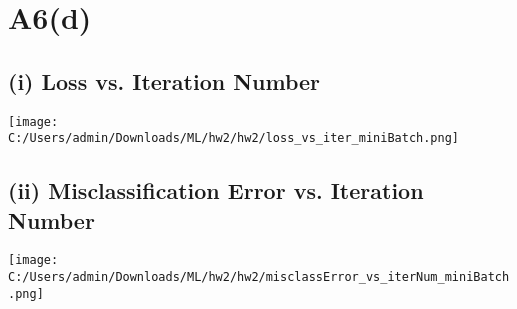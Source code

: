 \documentclass{article}
\begin{document}
\section*{A6(d)}

\subsection*{(i) Loss vs. Iteration Number}
\begin{center}
    \texttt{[image: C:/Users/admin/Downloads/ML/hw2/hw2/loss\_vs\_iter\_miniBatch.png]}
\end{center}

\subsection*{(ii) Misclassification Error vs. Iteration Number}
\begin{center}
    \texttt{[image: C:/Users/admin/Downloads/ML/hw2/hw2/misclassError\_vs\_iterNum\_miniBatch.png]}
\end{center}
\end{document}

